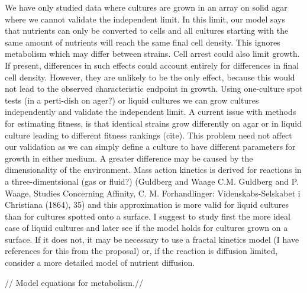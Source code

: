 We have only studied data where cultures are grown in an array on
solid agar where we cannot validate the independent limit. In this
limit, our model says that nutrients can only be converted to cells
and all cultures starting with the same amount of nutrients will reach
the same final cell density. This ignores metabolism which may differ
between strains. Cell arrest could also limit growth. If present,
differences in such effects could account entirely for differences in
final cell density. However, they are unlikely to be the only effect,
because this would not lead to the observed characteristic endpoint in
growth. Using one-culture spot tests (in a perti-dish on ager?) or
liquid cultures we can grow cultures independently and validate the
independent limit. A current issue with methods for estimating
fitness, is that identical strains grow differently on agar or in
liquid culture leading to different fitness rankings (cite). This
problem need not affect our validation as we can simply define a
culture to have different parameters for growth in either medium. A
greater difference may be caused by the dimensionality of the
environment. Mass action kinetics is derived for reactions in a
three-dimentsional (gas or fluid?) (Guldberg and Waage C.M. Guldberg
and P. Waage, Studies Concerning Affinity, C. M. Forhandlinger:
Videnskabs-Selskabet i Christiana (1864), 35) and this approximation
is more valid for liquid cultures than for cultures spotted onto a
surface. I suggest to study first the more ideal case of liquid
cultures and later see if the model holds for cultures grown on a
surface. If it does not, it may be necessary to use a fractal kinetics
model (I have references for this from the proposal) or, if the
reaction is diffusion limited, consider a more detailed model of
nutrient diffusion.

// Model equations for metabolism.//

